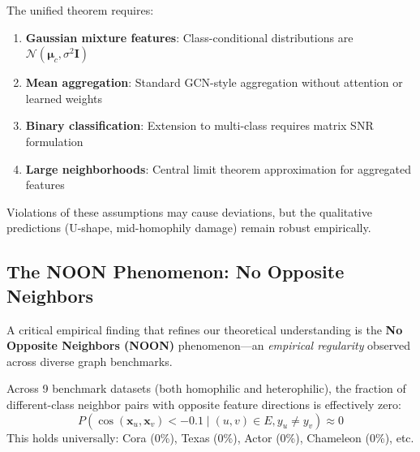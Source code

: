 \begin{remark}
\label{rem:unified_assumptions}
The unified theorem requires:
\begin{enumerate}
    \item \textbf{Gaussian mixture features}: Class-conditional distributions are $\mathcal{N}(\boldsymbol{\mu}_c, \sigma^2 \mathbf{I})$
    \item \textbf{Mean aggregation}: Standard GCN-style aggregation without attention or learned weights
    \item \textbf{Binary classification}: Extension to multi-class requires matrix SNR formulation
    \item \textbf{Large neighborhoods}: Central limit theorem approximation for aggregated features
\end{enumerate}
Violations of these assumptions may cause deviations, but the qualitative predictions (U-shape, mid-homophily damage) remain robust empirically.
\end{remark}

\subsection{The NOON Phenomenon: No Opposite Neighbors}
\label{sec:noon}

A critical empirical finding that refines our theoretical understanding is the \textbf{No Opposite Neighbors (NOON)} phenomenon---an \textit{empirical regularity} observed across diverse graph benchmarks.

\begin{observation}
\label{obs:noon}
Across 9 benchmark datasets (both homophilic and heterophilic), the fraction of different-class neighbor pairs with opposite feature directions is effectively zero:
\begin{equation}
    P(\cos(\mathbf{x}_u, \mathbf{x}_v) < -0.1 \mid (u,v) \in E, y_u \neq y_v) \approx 0
\end{equation}
This holds universally: Cora (0\%), Texas (0\%), Actor (0\%), Chameleon (0\%), etc.
\end{observation}

